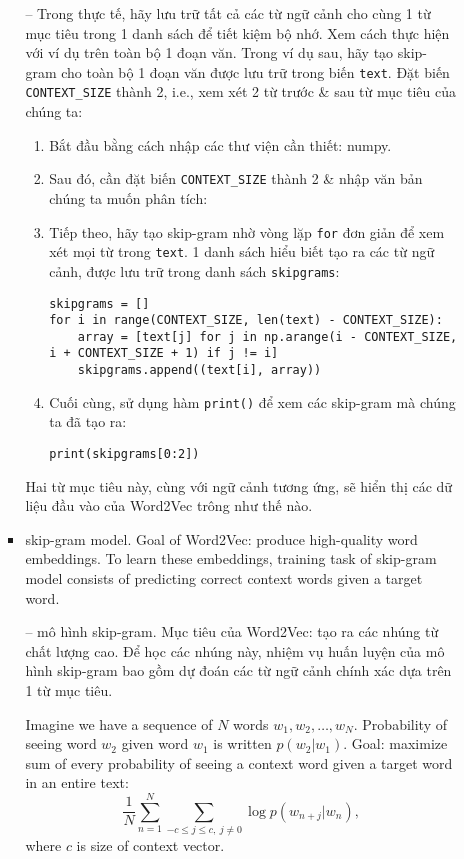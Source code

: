 \documentclass{article}
\begin{document}
\begin{itemize}
\begin{itemize}
\begin{itemize}
            -- Trong thực tế, hãy lưu trữ tất cả các từ ngữ cảnh cho cùng 1 từ mục tiêu trong 1 danh sách để tiết kiệm bộ nhớ. Xem cách thực hiện với ví dụ trên toàn bộ 1 đoạn văn. Trong ví dụ sau, hãy tạo skip-gram cho toàn bộ 1 đoạn văn được lưu trữ trong biến {\tt text}. Đặt biến \verb|CONTEXT_SIZE| thành 2, i.e., xem xét 2 từ trước \& sau từ mục tiêu của chúng ta:
            \begin{enumerate}
                \item Bắt đầu bằng cách nhập các thư viện cần thiết: numpy.
                \item Sau đó, cần đặt biến \verb|CONTEXT_SIZE| thành 2 \& nhập văn bản chúng ta muốn phân tích:
                \item Tiếp theo, hãy tạo skip-gram nhờ vòng lặp {\tt for} đơn giản để xem xét mọi từ trong {\tt text}. 1 danh sách hiểu biết tạo ra các từ ngữ cảnh, được lưu trữ trong danh sách {\tt skipgrams}:
                \begin{verbatim}
skipgrams = []
for i in range(CONTEXT_SIZE, len(text) - CONTEXT_SIZE):
    array = [text[j] for j in np.arange(i - CONTEXT_SIZE, i + CONTEXT_SIZE + 1) if j != i]
    skipgrams.append((text[i], array))
                \end{verbatim}
                \item Cuối cùng, sử dụng hàm {\tt print()} để xem các skip-gram mà chúng ta đã tạo ra:
                \begin{verbatim}
print(skipgrams[0:2])
                \end{verbatim}
            \end{enumerate}
            Hai từ mục tiêu này, cùng với ngữ cảnh tương ứng, sẽ hiển thị các dữ liệu đầu vào của Word2Vec trông như thế nào.
            \item {\sf skip-gram model.} Goal of Word2Vec: produce high-quality word embeddings. To learn these embeddings, training task of skip-gram model consists of predicting correct context words given a target word.

            -- {\sf mô hình skip-gram.} Mục tiêu của Word2Vec: tạo ra các nhúng từ chất lượng cao. Để học các nhúng này, nhiệm vụ huấn luyện của mô hình skip-gram bao gồm dự đoán các từ ngữ cảnh chính xác dựa trên 1 từ mục tiêu.

            Imagine we have a sequence of $N$ words $w_1,w_2,\ldots,w_N$. Probability of seeing word $w_2$ given word $w_1$ is written $p(w_2|w_1)$. Goal: maximize sum of every probability of seeing a context word given a target word in an entire text:
            \begin{equation*}
                \frac{1}{N}\sum_{n=1}^N\sum_{-c\le j\le c,\ j\ne0} \log p(w_{n+j}|w_n),
            \end{equation*}
            where $c$ is size of context vector.


\end{itemize}
\end{itemize}
\end{itemize}
\end{document}
